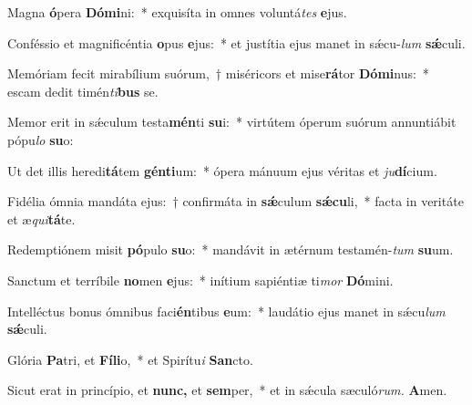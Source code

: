 \item Magna \textbf{ó}pera \textbf{Dó}\textbf{mi}ni:~* exquisíta in omnes voluntá\hspace{0.03em}\textit{tes} \textbf{e}jus.
\item Conféssio et magnificéntia \textbf{o}pus \textbf{e}jus:~* et justítia ejus manet in sǽcu-\textit{lum} \textbf{sǽ}culi.
\item Memóriam fecit mirabílium suórum,~† miséricors et mise\textbf{rá}tor \textbf{Dó}\textbf{mi}nus:~* escam dedit timén\hspace{0.03em}\textit{ti}\textbf{bus} se.
\item Memor erit in sǽculum testa\textbf{mén}ti \textbf{su}i:~* virtútem óperum suórum annuntiábit pópu\hspace{0.03em}\textit{lo} \textbf{su}o:
\item Ut det illis heredi\textbf{tá}tem \textbf{gén}\textbf{ti}um:~* ópera mánuum ejus véritas et \textit{ju}\textbf{dí}cium.
\item Fidélia ómnia mandáta ejus:~† confirmáta in \textbf{sǽ}culum \textbf{sǽ}\textbf{cu}li,~* facta in veritáte et æ\hspace{0.03em}\textit{qui}\textbf{tá}te.
\item Redemptiónem misit \textbf{pó}pulo \textbf{su}o:~* mandávit in ætérnum testamén-\textit{tum} \textbf{su}um.
\item Sanctum et terríbile \textbf{no}men \textbf{e}jus:~* inítium sapiéntiæ ti\hspace{0.03em}\textit{mor} \textbf{Dó}mini.
\item Intelléctus bonus ómnibus faci\textbf{én}tibus \textbf{e}um:~* laudátio ejus manet in sǽcu\hspace{0.03em}\textit{lum} \textbf{sǽ}culi.
\item Glória \textbf{Pa}tri, et \textbf{Fí}\textbf{li}o,~* et Spirítu\hspace{0.03em}\textit{i} \textbf{San}cto.
\item Sicut erat in princípio, et \textbf{nunc,} et \textbf{sem}per,~* et in sǽcula sæculó\textit{rum.} \textbf{A}men.
